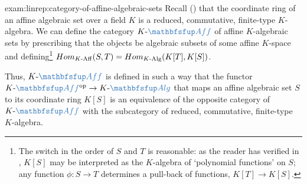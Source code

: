 \begin{exam}{}{exam:linrep:category-of-affine-algebraic-sets}
  Recall () that the coordinate ring of an
  affine algebraic set over a field $K$ is a reduced, commutative,
  finite-type $K$-algebra. We can define the category
  $K\text{-}\categ{Aff}$ of affine $K$-algebraic sets by prescribing
  that the objects be algebraic subsets of some affine $K$-space and
  defining\footnote{The switch in the order of $S$ and $T$ is
    reasonable: as the reader has verified in
    , $K[S]$ may be
    interpreted as the $K$-algebra of `polynomial functions' on $S$;
    any function $\phi : S \to T$ determines a pull-back of functions,
    $K[T] \to K[S]$.}
  $Hom_{K\text{-}\mathrm{Aff}}(S, T) =
  Hom_{K\text{-}\mathrm{Alg}}(K[T], K[S])$.

  Thus, $K\text{-}\categ{Aff}$ is defined in such a way that the
  functor
  $K\text{-}\categ{Aff}^{\mathrm{op}} \to K\text{-}\categ{Alg}$ that
  maps an affine algebraic set $S$ to its coordinate ring $K[S]$ is an
  equivalence of the opposite category of $K\text{-}\categ{Aff}$ with
  the subcategory of reduced, commutative, finite-type $K$-algebra.
\end{exam}

